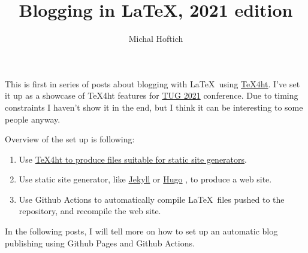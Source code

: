 \documentclass{article}
\title{Blogging in LaTeX, 2021 edition}
\author{Michal Hoftich}
\begin{document}
\maketitle


This is first in series of posts about blogging with \LaTeX\ using
\href{https://tug.org/tex4ht/}{\TeX4ht}. I've set it up as a showcase of
\TeX4ht features for \href{https://tug.org/tug2021/}{TUG 2021} conference.
Due to timing constraints I haven't show it in the end, but I think it 
can be interesting to some people anyway.

Overview of the set up is following:

\begin{enumerate}
\item Use \href{/testblog/2021/07/30/how-to-blog-with-tex4ht.html}
{\TeX4ht to produce files suitable for static site generators}.
\item Use static site generator, like \href{https://jekyllrb.com/}{Jekyll}
or \href{https://gohugo.io/}{Hugo}
, to produce a web site.
\item Use Github Actions to automatically compile \LaTeX\ files pushed
to the repository, and recompile the web site. 
\end{enumerate}

In the following posts, I will tell more on how to set up an automatic
blog publishing using Github Pages and Github Actions.
\end{document}

